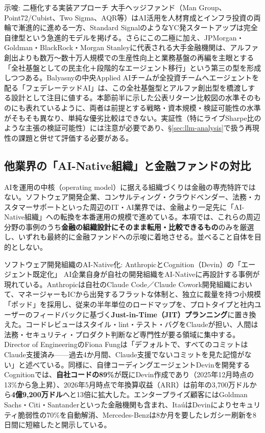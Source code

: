 \begin{insight}{示唆: 二極化する実装アプローチ}
大手ヘッジファンド（Man Group、Point72/Cubist、Two Sigma、AQR等）はAI活用を人材育成とインフラ投資の両輪で漸進的に進める一方、Standard SignalのようなYC発スタートアップは完全自律型という急進的モデルを掲げる。さらにこの二極に加え、JPMorgan・Goldman・BlackRock・Morgan Stanleyに代表される大手金融機関は、アルファ創出よりも数万〜数十万人規模での生産性向上と業務基盤の再編を主眼とする「全社基盤としての民主化＋段階的なエージェント移行」という第三の型を形成しつつある。Balyasnyの中央Applied AIチームが全投資チームへエージェントを配る「フェデレーテッドAI」は、この全社基盤型とアルファ創出型を橋渡しする設計として注目に値する。本節前半に示した公表リターン比較図の水準そのものにも表れているように、両者は前提とする戦略・資本規模・検証可能性の水準がそもそも異なり、単純な優劣比較はできない。実証性（特にライブSharpe比のような主張の検証可能性）には注意が必要であり、\S\ref{sec:llm-analysis}で扱う再現性の課題と併せて評価する必要がある。
\end{insight}

\subsection{他業界の「AI-Native組織」と金融ファンドの対比}
\label{sec:ai-native-funds-crossdomain}

AIを運用の中核（operating model）に据える組織づくりは金融の専売特許ではない。ソフトウェア開発企業、コンサルティング・クラウドベンダー、法務・カスタマーサポートといった周辺のIT・AI業界では、金融より一足先に「AI-Native組織」への転換を本番運用の規模で進めている。本項では、これらの周辺分野の事例のうち\textbf{金融の組織設計にそのまま転用・比較できるもの}のみを厳選し、いずれも最終的に金融ファンドへの示唆に着地させる。並べること自体を目的としない。

\begin{casestudy}{ソフトウェア開発組織のAI-Native化: AnthropicとCognition（Devin）の「エージェント既定化」}
AI企業自身が自社の開発組織をAI-Nativeに再設計する事例が現れている。Anthropicは自社のClaude Code／Claude Cowork開発組織において、マネージャーもICから出発するフラットな体制と、独立に裁量を持つ小規模「ポッド」を採用し、従来の半年単位のロードマップを、プロトタイプと社内ユーザーのフィードバックに基づく\textbf{Just-in-Time（JIT）プランニング}に置き換えた。コードレビューはスタイル・lint・テスト・バグをClaudeが担い、人間は法務・セキュリティ・プロダクト判断など専門性が要る領域に集中する。Director of EngineeringのFiona Fungは「デフォルトで、すべてのコミットはClaude支援済み——過去4か月間、Claude支援でないコミットを見た記憶がない」と述べている\cite{y03anthropic2026ainativeorg}。同様に、自律コーディングエージェントDevinを開発するCognitionでは、\textbf{自社コードの89\%}が既にDevin作成であり（2025年12月時点の13\%から急上昇）、2026年5月時点で年換算収益（ARR）は前年の3,700万ドルから\textbf{4億9,200万ドル}へと13倍に拡大した。エンタープライズ顧客にはGoldman Sachs・Citi・Santanderといった金融機関も含まれ、Ita\'uはDevinによりセキュリティ脆弱性の70\%を自動解消、Mercedes-Benzは8か月を要したレガシー刷新を8日間に短縮したと開示している\cite{y03techcrunch2026cognitionraise}。
\end{casestudy}

